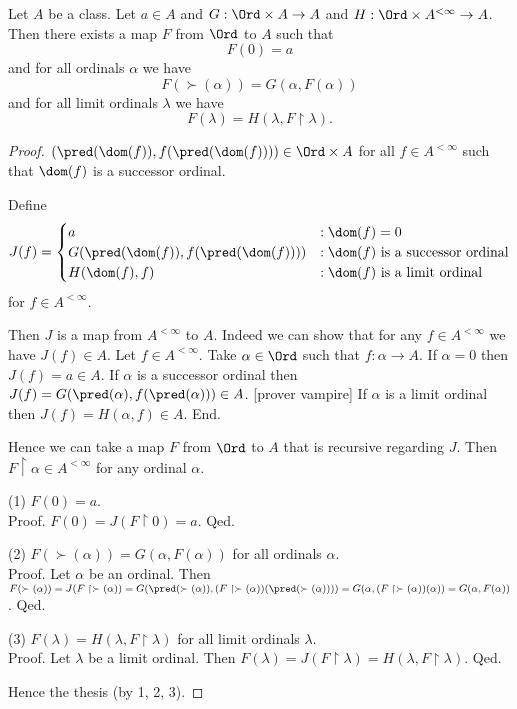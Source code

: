 \documentclass{article}
\begin{document}
  \begin{forthel}
    \begin{corollary*}[id=recursion]
      Let $A$ be a class.
      Let $a \in A$ and $G : \Ord \times A \to A$ and $H : \Ord \times A^{< \infty} \to A$.
      Then there exists a map $F$ from $\Ord$ to $A$ such that
      \[ F(0) = a \]
      and for all ordinals $\alpha$ we have
      \[ F(\succ(\alpha)) = G(\alpha, F(\alpha)) \]
      and for all limit ordinals $\lambda$ we have
      \[ F(\lambda) = H(\lambda, F \restriction \lambda). \]
    \end{corollary*}
    \begin{proof}
      $(\pred(\dom(f)), f(\pred(\dom(f)))) \in \Ord \times A$ for all $f \in A^{< \infty}$ such that $\dom(f)$ is a successor ordinal.

      Define  \[ J(f) =
        \begin{cases}
          a
          & : \dom(f) = 0
          \\
          G(\pred(\dom(f)), f(\pred(\dom(f))))
          & : \text{$\dom(f)$ is a successor ordinal}
          \\
          H(\dom(f), f)
          & : \text{$\dom(f)$ is a limit ordinal}
        \end{cases} \]
      for $f \in A^{< \infty}$.

      Then $J$ is a map from $A^{< \infty}$ to $A$.
      Indeed we can show that for any $f \in A^{< \infty}$ we have $J(f) \in A$.
        Let $f \in A^{< \infty}$.
        Take $\alpha \in \Ord$ such that $f : \alpha \to A$.
        If $\alpha = 0$ then $J(f) = a \in A$.
        If $\alpha$ is a successor ordinal then $J(f) =
        G(\pred(\alpha), f(\pred(\alpha))) \in A$.
        [prover vampire]
        If $\alpha$ is a limit ordinal then $J(f) = H(\alpha, f) \in A$.
      End.

      Hence we can take a map $F$ from $\Ord$ to $A$ that is recursive regarding $J$.
      Then $F \restriction \alpha \in A^{< \infty}$ for any ordinal $\alpha$.

      (1) $F(0) = a$. \\
      Proof.
        $F(0)
          = J(F \restriction 0)
          = a$.
      Qed.

      (2) $F(\succ(\alpha)) = G(\alpha, F(\alpha))$ for all ordinals $\alpha$. \\
      Proof.
        Let $\alpha$ be an ordinal.
        Then $F(\succ(\alpha))
          = J(F \restriction \succ(\alpha))
          = G(\pred(\succ(\alpha)), (F \restriction \succ(\alpha))(\pred(\succ(\alpha))))
          = G(\alpha, (F \restriction \succ(\alpha))(\alpha))
          = G(\alpha, F(\alpha))$.
      Qed.

      (3) $F(\lambda) = H(\lambda, F \restriction \lambda)$ for all limit ordinals $\lambda$. \\
      Proof.
        Let $\lambda$ be a limit ordinal.
        Then $F(\lambda)
          = J(F \restriction \lambda)
          = H(\lambda, F \restriction \lambda)$.
      Qed.

      Hence the thesis (by 1, 2, 3).
    \end{proof}
  \end{forthel}

  \printbibliography
\end{document}
